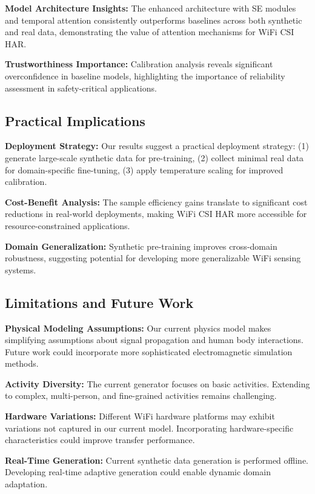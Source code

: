 \documentclass[journal]{IEEEtran}
\begin{document}
\textbf{Model Architecture Insights:} The enhanced architecture with SE modules and temporal attention consistently outperforms baselines across both synthetic and real data, demonstrating the value of attention mechanisms for WiFi CSI HAR.

\textbf{Trustworthiness Importance:} Calibration analysis reveals significant overconfidence in baseline models, highlighting the importance of reliability assessment in safety-critical applications.

\subsection{Practical Implications}

\textbf{Deployment Strategy:} Our results suggest a practical deployment strategy: (1) generate large-scale synthetic data for pre-training, (2) collect minimal real data for domain-specific fine-tuning, (3) apply temperature scaling for improved calibration.

\textbf{Cost-Benefit Analysis:} The sample efficiency gains translate to significant cost reductions in real-world deployments, making WiFi CSI HAR more accessible for resource-constrained applications.

\textbf{Domain Generalization:} Synthetic pre-training improves cross-domain robustness, suggesting potential for developing more generalizable WiFi sensing systems.

\subsection{Limitations and Future Work}

\textbf{Physical Modeling Assumptions:} Our current physics model makes simplifying assumptions about signal propagation and human body interactions. Future work could incorporate more sophisticated electromagnetic simulation methods.

\textbf{Activity Diversity:} The current generator focuses on basic activities. Extending to complex, multi-person, and fine-grained activities remains challenging.

\textbf{Hardware Variations:} Different WiFi hardware platforms may exhibit variations not captured in our current model. Incorporating hardware-specific characteristics could improve transfer performance.

\textbf{Real-Time Generation:} Current synthetic data generation is performed offline. Developing real-time adaptive generation could enable dynamic domain adaptation.
\end{document}
